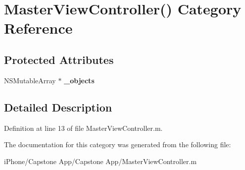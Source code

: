\hypertarget{category_master_view_controller_07_08}{\section{Master\-View\-Controller() Category Reference}
\label{category_master_view_controller_07_08}
}
\subsection*{Protected Attributes}
\begin{DoxyCompactItemize}
\item 
\hypertarget{category_master_view_controller_07_08_a8bfcd853fdb93c41b3393f01977be503}{N\-S\-Mutable\-Array $\ast$ {\bfseries \-\_\-objects}}\label{category_master_view_controller_07_08_a8bfcd853fdb93c41b3393f01977be503}

\end{DoxyCompactItemize}


\subsection{Detailed Description}


Definition at line 13 of file Master\-View\-Controller.\-m.



The documentation for this category was generated from the following file\-:\begin{DoxyCompactItemize}
\item 
i\-Phone/\-Capstone App/\-Capstone App/Master\-View\-Controller.\-m\end{DoxyCompactItemize}
